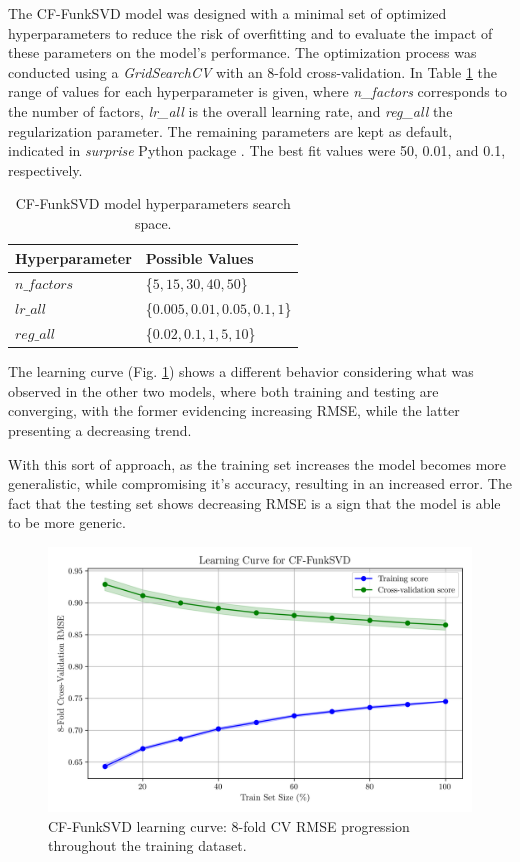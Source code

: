 \documentclass[conference]{IEEEtran}
\begin{document}
The CF-FunkSVD model was designed with a minimal set of optimized hyperparameters to reduce the risk of overfitting and to evaluate the impact of these parameters on the model's performance. The optimization process was conducted using a \textit{GridSearchCV} with an 8-fold cross-validation. In Table \ref{parametrosSVD} the range of values for each hyperparameter is given, where \textit{n\_factors} corresponds to the number of factors, \textit{lr\_all} is the overall learning rate, and \textit{reg\_all} the regularization parameter. The remaining parameters are kept as default, indicated in \textit{surprise} Python package \cite{surprise}. The best fit values were 50, 0.01, and 0.1, respectively.

\begin{table}[H]
\centering
\caption{CF-FunkSVD model hyperparameters search space.}
\label{parametrosSVD}
\begin{tabular}{ll}
\toprule
\textbf{Hyperparameter} & \textbf{Possible Values} \\
\midrule
$n\_factors$ & \{$5,15,30,40,50$\} \\ 
$lr\_all$ & \{$0.005, 0.01, 0.05, 0.1, 1$\} \\ 
$reg\_all$ & \{$0.02,0.1,1,5,10$\} \\ 
\bottomrule
\end{tabular}
\end{table}

The learning curve (Fig. \ref{fig:model03_learningcurve}) shows a different behavior considering what was observed in the other two models, where both training and testing are converging, with the former evidencing increasing RMSE, while the latter presenting a decreasing trend.

With this sort of approach, as the training set increases the model becomes more generalistic, while compromising it's accuracy, resulting in an increased error. The fact that the testing set shows decreasing RMSE is a sign that the model is able to be more generic.

\begin{figure}[H]
    \centering
    \includegraphics[width=1\linewidth]{assets/model03_learningcurve.png}
    \caption{CF-FunkSVD learning curve: 8-fold CV RMSE progression throughout the training dataset.}
    \label{fig:model03_learningcurve}
\end{figure}
\end{document}

